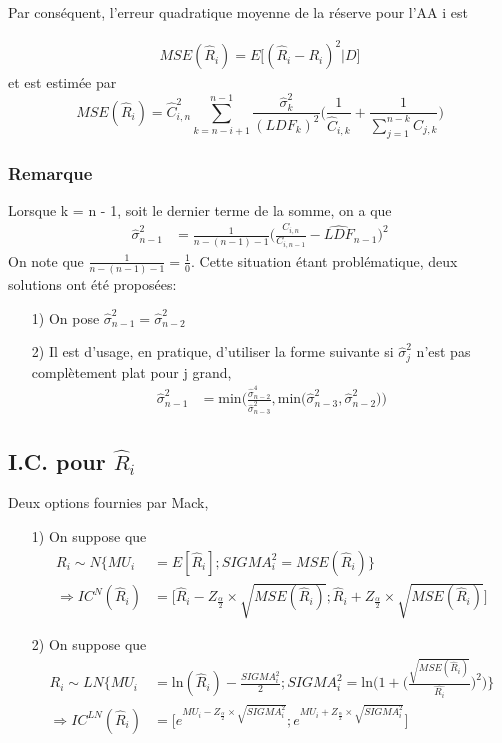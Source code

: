 Par conséquent, l'erreur quadratique moyenne de la réserve pour l'AA i est

\begin{align*}
MSE(\widehat{R}_i) =E \big[ (\widehat{R}_i - R_i)^2 | D \big]
\end{align*}
et est estimée par
\begin{equation}
MSE(\widehat{R}_i) = \widehat{C}_{i,n}^2 \sum_{k = n - i + 1}^{n-1} \frac{\widehat{\sigma}_k^2}{(LDF_k)^2} \Bigg( \frac{1}{\widehat{C}_{i,k}} + \frac{1}{\sum_{j=1}^{n-k}C_{j,k}}\Bigg)
\end{equation}
\subsubsection*{Remarque}
Lorsque k = n - 1, soit le dernier terme de la somme, on a que
\begin{align*}
\widehat{\sigma}_{n-1}^2 &= \frac{1}{n-(n-1)-1} \Bigg( \frac{C_{i,n}}{C_{i,n-1}} - \widehat{LDF}_{n-1}\Bigg)^2
\end{align*}
On note que $\frac{1}{n-(n-1)-1} = \frac{1}{0}$. Cette situation étant problématique, deux solutions ont été proposées:
\begin{itemize}
\item[1)] On pose $\widehat{\sigma}_{n-1}^2 = \widehat{\sigma}_{n-2}^2$
\item[2)] Il est d'usage, en pratique, d'utiliser la forme suivante si $\widehat{\sigma}_{j}^2$ n'est pas complètement plat pour j grand,
\begin{align*}
\widehat{\sigma}_{n-1}^2 &= \text{min} \Bigg( \frac{\widehat{\sigma}_{n-2}^4}{\widehat{\sigma}_{n-3}^2}, \text{min} \Big( \widehat{\sigma}_{n-3}^2, \widehat{\sigma}_{n-2}^2 \Big) \Bigg)
\end{align*}
\end{itemize}

\subsection*{I.C. pour $\widehat{R}_i$}
Deux options fournies par Mack,
\begin{itemize}
\item[1)] On suppose que 
\begin{align*}
R_i \sim N \bigg\lbrace MU_i &= E[\widehat{R}_i]; SIGMA_i^2 = MSE(\widehat{R}_i) \bigg\rbrace \\
\Rightarrow IC^N(\widehat{R}_i) &= \bigg[ \widehat{R}_i - Z_{\frac{\alpha}{2}} \times \sqrt{MSE(\widehat{R}_i)}; \widehat{R}_i + Z_{\frac{\alpha}{2}} \times \sqrt{MSE(\widehat{R}_i)} \bigg]
\end{align*}
\item[2)] On suppose que 
\begin{align*}
R_i \sim LN \Bigg\lbrace MU_i &= \text{ln}(\widehat{R}_i) - \frac{SIGMA_i^2}{2}; SIGMA_i^2 = \text{ln} \Bigg( 1 + \Bigg( \frac{\sqrt{MSE(\widehat{R}_i)}}{\widehat{R_i}}\Bigg)^2 \Bigg) \Bigg\rbrace \\
\Rightarrow IC^{LN}(\widehat{R}_i) &= \Bigg[ e^{MU_i - Z_{\frac{\alpha}{2}} \times \sqrt{SIGMA_i^2}}; e^{MU_i + Z_{\frac{\alpha}{2}} \times \sqrt{SIGMA_i^2}} \Bigg]
\end{align*}
\end{itemize}

